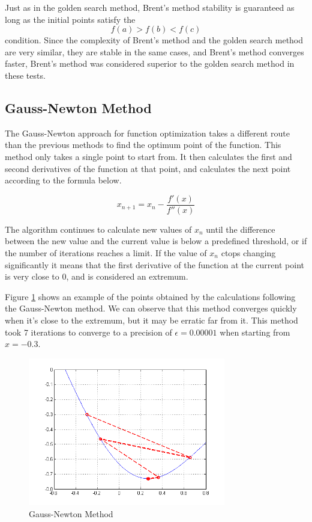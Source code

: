 \documentclass[journal]{IEEEtran}
\begin{document}
Just as in the golden search method, Brent's method stability is guaranteed as long as the initial points satisfy the $$f(a)>f(b)<f(c)$$ condition. Since the complexity of Brent's method and the golden search method are very similar, they are stable in the same cases, and Brent's method converges faster, Brent's method was considered superior to the golden search method in these tests.

\subsection{Gauss-Newton Method}

The Gauss-Newton approach for function optimization takes a different route than the previous methods to find the optimum point of the function. This method only takes a single point to start from. It then calculates the first and second derivatives of the function at that point, and calculates the next point according to the formula below.

$$x_{n+1} = x_n - \frac{f'(x)}{f''(x)}$$ \cite{yohan}

The algorithm continues to calculate new values of $x_n$ until the difference between the new value and the current value is below a predefined threshold, or if the number of iterations reaches a limit. If the value of $x_n$ ctops changing significantly it means that the first derivative of the function at the current point is very close to 0, and is considered an extremum.

Figure \ref{figGN} shows an example of the points obtained by the calculations following the Gauss-Newton method. We can observe that this method converges quickly when it's close to the extremum, but it may be erratic far from it. This method took 7 iterations to converge to a precision of $\epsilon = 0.00001$ when starting from $x = -0.3$.

\begin{figure}[H]
\centering
\includegraphics[width=3.4in]{figures/1d-newtonsMethod.png}
\caption{Gauss-Newton Method}
\label{figGN}
\end{figure}
\end{document}
